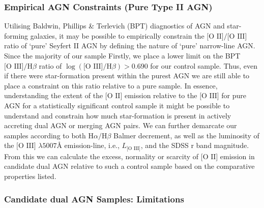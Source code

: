 \subsubsection{Empirical AGN Constraints (Pure Type II AGN)}

Utilising Baldwin, Phillips \& Terlevich (BPT) diagnostics of AGN and star-forming galaxies, it may be possible to empirically constrain the $\text{[O II]}/\text{[O III]}$ ratio of `pure' Seyfert II AGN by defining the nature of `pure' narrow-line AGN. Since the majority of our sample Firstly, we place a lower limit on the BPT $\text{[O III]}/\text{H}\beta$ ratio of $\log(\text{[O III]}/\text{H}\beta)>{0.690}$ for our control sample. Thus, even if there were star-formation present within the purest AGN we are still able to place a constraint on this ratio relative to a pure sample. In essence, understanding the extent of the $\text{[O II]}$ emission relative to the $\text{[O III]}$ for pure AGN for a statistically significant control sample it might be possible to understand and constrain how much star-formation is present in actively accreting dual AGN or merging AGN pairs. We can further demarcate our samples according to both $\text{H}\alpha/\text{H}\beta$ Balmer decrement, as well as the luminosity of the $\text{[O III]}$ $\lambda{5007}Å$ emission-line, i.e., $L_{\text{[O III]}}$, and the SDSS r band magnitude. From this we can calculate the excess, normality or scarcity of $\text{[O II]}$ emission in candidate dual AGN relative to such a control sample based on the comparative properties listed.

\subsubsection{Candidate dual AGN Samples: Limitations}
  
  